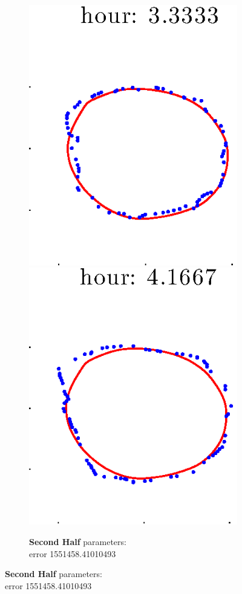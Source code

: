 \documentclass[12pt]{article}
\begin{document}
\begin{figure}[h!]
\begin{subfigure}[b]{.3\textwidth}
		\includegraphics[height=.15\textheight]{Pos10exp2/secondhalf/second5.eps}
		\includegraphics[height=.15\textheight]{Pos10exp2/secondhalf/second6.eps}
		\caption{\textbf{Second Half} parameters: \\error 1551458.41010493}
	\end{subfigure}
\end{figure}
\end{document}
